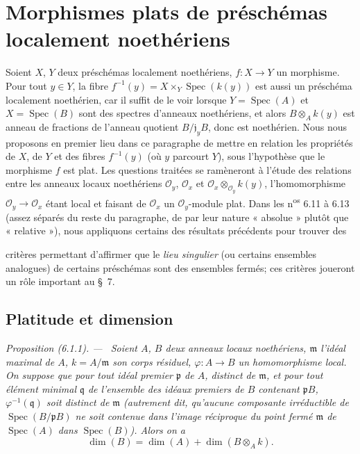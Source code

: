 \documentclass[10pt,oneside]{book}
\newcommand{\oldpage}[2][]{%
  \setcounter{footnote}{0}%
  \marginpar{\scriptsize\textbf{#1}~|~#2}\ignorespaces}
\newenvironment{proposition}[1][]{%
  \par\medskip\noindent\itshape Proposition (#1). ---\ }{\par}
\begin{document}
\section{Morphismes plats de préschémas localement noethériens}

Soient $X$, $Y$ deux préschémas localement noethériens, $f:X\to Y$ un
morphisme. Pour tout $y\in Y$, la fibre
$f^{-1}(y)=X\times_Y\operatorname{Spec}(k(y))$ est aussi un préschéma
localement noethérien, car il suffit de le voir lorsque
$Y=\operatorname{Spec}(A)$ et $X=\operatorname{Spec}(B)$ sont des spectres
d'anneaux noethériens, et alors $B\otimes_A k(y)$ est anneau de fractions de
l'anneau quotient $B/\mathfrak j_yB$, donc est noethérien. Nous nous proposons
en premier lieu dans ce paragraphe de mettre en relation les propriétés de
$X$, de $Y$ et des fibres $f^{-1}(y)$ (où $y$ parcourt $Y$), sous l'hypothèse
que le morphisme $f$ est plat. Les questions traitées se ramèneront à l'étude
des relations entre les anneaux locaux noethériens
$\mathcal O_y$, $\mathcal O_x$ et
$\mathcal O_x\otimes_{\mathcal O_y}k(y)$, l'homomorphisme
$\mathcal O_y\to\mathcal O_x$ étant local et faisant de $\mathcal O_x$ un
$\mathcal O_y$-module plat. Dans les n\textsuperscript{os} 6.11 à 6.13 (assez
séparés du reste du paragraphe, de par leur nature « absolue » plutôt que
« relative »), nous appliquons certains des résultats précédents pour trouver
des

\oldpage[IV-2]{135}

critères permettant d'affirmer que le \emph{lieu singulier} (ou certains
ensembles analogues) de certains préschémas sont des ensembles fermés; ces
critères joueront un rôle important au §~7.

\subsection{Platitude et dimension}

\begin{proposition}[6.1.1]
\label{IV.2.s6.1.1-fr}
Soient $A$, $B$ deux anneaux locaux noethériens, $\mathfrak m$ l'idéal maximal
de $A$, $k=A/\mathfrak m$ son corps résiduel,
$\varphi:A\to B$ un homomorphisme local. On suppose que pour tout idéal
premier $\mathfrak p$ de $A$, distinct de $\mathfrak m$, et pour tout élément
minimal $\mathfrak q$ de l'ensemble des idéaux premiers de $B$ contenant
$\mathfrak pB$, $\varphi^{-1}(\mathfrak q)$ soit distinct de $\mathfrak m$
(autrement dit, qu'aucune composante irréductible de
$\operatorname{Spec}(B/\mathfrak pB)$ ne soit contenue dans l'image réciproque
du point fermé $\mathfrak m$ de $\operatorname{Spec}(A)$ dans
$\operatorname{Spec}(B)$). Alors on a
\begin{equation}
\dim(B)=\dim(A)+\dim(B\otimes_A k).
\tag{6.1.1.1}\label{IV.2.s6.1.1.1-fr}
\end{equation}
\end{proposition}
\end{document}
